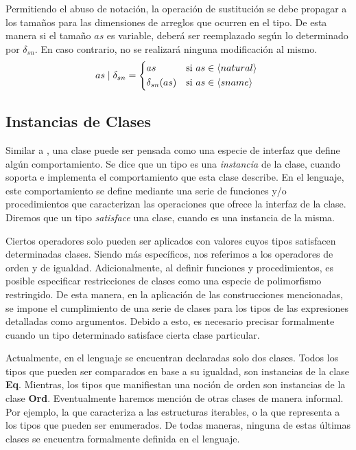 Permitiendo el abuso de notación, la operación de sustitución se debe propagar a los tamaños para las dimensiones de arreglos que ocurren en el tipo.
De esta manera si el tamaño $as$ es variable, deberá ser reemplazado según lo determinado por $\delta_{sn}$.
En caso contrario, no se realizará ninguna modificación al mismo.
\begin{align*}
as \mid \delta_{sn} =
\begin{cases*}
as
&
si $as \in \NT{natural}$
\\
\delta_{sn}(as)
&
si $as \in \NT{sname}$
\end{cases*}
\end{align*}

\subsection{Instancias de Clases}

Similar a \Haskell{}, una clase puede ser pensada como una especie de interfaz que define algún comportamiento.
Se dice que un tipo es una \textit{instancia} de la clase, cuando soporta e implementa el comportamiento que esta clase describe.
En el lenguaje, este comportamiento se define mediante una serie de funciones y/o procedimientos que caracterizan las operaciones que ofrece la interfaz de la clase.
Diremos que un tipo \textit{satisface} una clase, cuando es una instancia de la misma.

Ciertos operadores solo pueden ser aplicados con valores cuyos tipos satisfacen determinadas clases.
Siendo más específicos, nos referimos a los operadores de orden y de igualdad.
Adicionalmente, al definir funciones y procedimientos, es posible especificar restricciones de clases como una especie de polimorfismo restringido.
De esta manera, en la aplicación de las construcciones mencionadas, se impone el cumplimiento de una serie de clases para los tipos de las expresiones detalladas como argumentos.
Debido a esto, es necesario precisar formalmente cuando un tipo determinado satisface cierta clase particular.

Actualmente, en el lenguaje se encuentran declaradas solo dos clases.
Todos los tipos que pueden ser comparados en base a su igualdad, son instancias de la clase \textbf{Eq}.
Mientras, los tipos que manifiestan una noción de orden son instancias de la clase \textbf{Ord}.
Eventualmente haremos mención de otras clases de manera informal.
Por ejemplo, la que caracteriza a las estructuras iterables, o la que representa a los tipos que pueden ser enumerados.
De todas maneras, ninguna de estas últimas clases se encuentra formalmente definida en el lenguaje.

